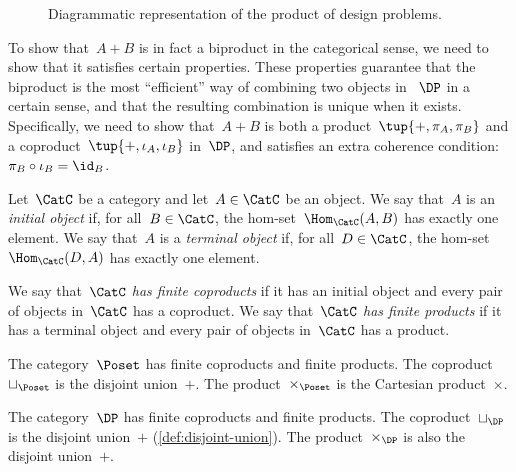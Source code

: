 \begin{figure}[h!]
  \begin{center}
  \end{center}
  \caption{Diagrammatic representation of the product of design problems. \label{fig:productdp}}
\end{figure}


To show that~$A + B$ is in fact a biproduct in the categorical sense, we need to show that it satisfies certain properties. These properties guarantee that the biproduct is the most ``efficient'' way of combining two objects in~$~\DP$ in a certain sense, and that the resulting combination is unique when it exists. Specifically, we need to show that~$A + B$ is both a product~$\tup{+, \pi_A, \pi_B}$ and a coproduct~$\tup{+, \iota_A, \iota_B}$ in~$\DP$, and satisfies an extra coherence condition:~$\pi_B \circ \iota_B = \id_B$.

\begin{ctdefinition}
  Let~$\CatC$ be a category and let~$A \in \CatC$ be an object. We say that~$A$ is an \emph{initial object} if, for all~$B \in\CatC$, the hom-set~$\Hom_\CatC(A,B)$ has exactly one element. We say that~$A$ is a \emph{terminal object} if, for all~$D\in\CatC$, the hom-set~$\Hom_\CatC(D,A)$ has exactly one element.
\end{ctdefinition}

\begin{ctdefinition}
  We say that~$\CatC$ \emph{has finite coproducts} if it has an initial object and every pair of objects in~$\CatC$ has a coproduct.
  We say that~$\CatC$ \emph{has finite products} if it has a terminal object and every pair of objects in~$\CatC$ has a product.
\end{ctdefinition}

\begin{example}
  The category~$\Poset$ has finite coproducts and finite products.
  The coproduct~$\sqcup_\Poset$ is the disjoint union~$+$.
  The product~$\times_\Poset$ is the Cartesian product~$\times$.
\end{example}

\begin{lemma}
  The category~$\DP$ has finite coproducts and finite products.
  The coproduct~$\sqcup_\DP$ is the disjoint union~$+$ (\cref{def:disjoint-union}).
  The product~$\times_\DP$ is also the disjoint union~$+$.
\end{lemma}

